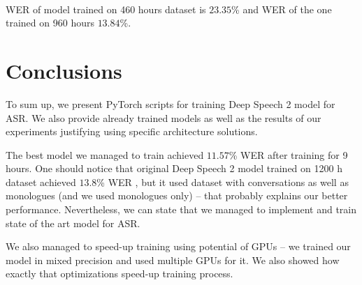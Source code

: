 \documentclass[licencjacka,en]{pracamgr}
\begin{document}
	\noindent%
	\begin{minipage}{\linewidth}%
		\label{fig:dataset}		     
	\end{minipage}\\
	
	WER of model trained on 460 hours dataset is $23.35$\% and WER of the one trained on 960 hours $13.84$\%.
	
	\chapter{Conclusions}\label{r:concls}
	
	To sum up, we present PyTorch scripts for training Deep Speech 2 model for ASR. We also provide already trained models as well as the results of our experiments justifying using specific architecture solutions.
	
	The best model we managed to train achieved $11.57$\% WER after training for 9 hours. One should notice that original Deep Speech 2 model trained on 1200 h dataset achieved $13.8$\% WER \cite{DS2}, but it used dataset with conversations as well as monologues (and we used monologues only) -- that probably explains our better performance. Nevertheless, we can state that we managed to implement and train state of the art model for ASR.
	
	We also managed to speed-up training using potential of GPUs -- we trained our model in mixed precision and used multiple GPUs for it. We also showed how exactly that optimizations speed-up training process.
	
\end{document}
